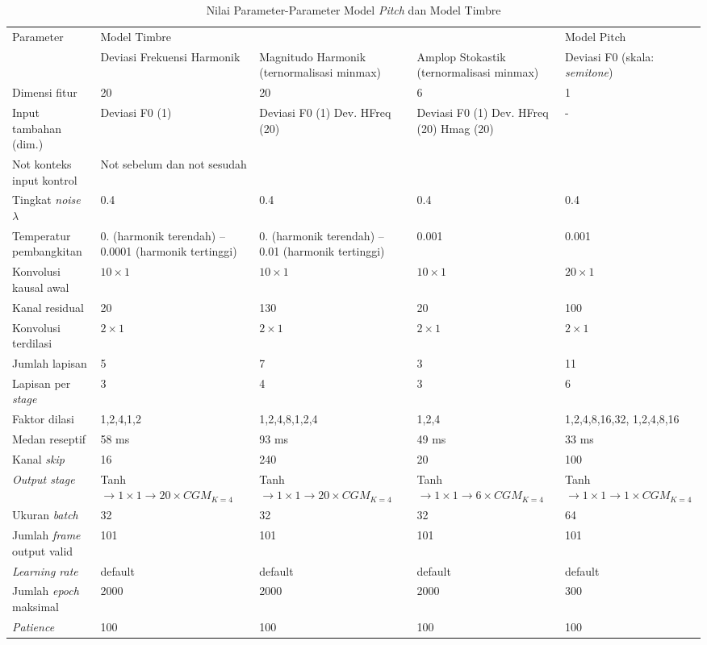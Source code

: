 \begin{table}[htbp]
	\newlength\colwidth
	\setlength{}
	\centering
	\caption{Nilai Parameter-Parameter Model \textit{Pitch} dan Model Timbre}\label{tab-timbre-pitch-model-parameters}
	\begin{tabular}{|p{\colwidth}|p{\colwidth}|p{\colwidth}|p{\colwidth}|p{\colwidth}|}
	\hline
	\multirow{2}{*}{Parameter}&\multicolumn{3}{|p{\dimexpr 3\colwidth}|}{Model Timbre}&{Model Pitch}\\\cline{2-5}
	&Deviasi Frekuensi Harmonik&Magnitudo Harmonik (ternormalisasi minmax)&Amplop Stokastik (ternormalisasi minmax)&Deviasi F0 (skala: \textit{semitone})\\\hline
	Dimensi fitur&20&20&6&1\\\hline
	Input tambahan (dim.)& Deviasi F0 (1) & Deviasi F0 (1) \newline Dev. HFreq (20) & Deviasi F0 (1) \newline Dev. HFreq (20) \newline Hmag (20) & - \\
	\hline
	Not konteks input kontrol & \multicolumn{4}{|p{\dimexpr 4\colwidth}|}{
	Not sebelum dan not sesudah
	}\\\hline
	Tingkat \textit{noise} $\lambda$ & 0.4&0.4&0.4&0.4\\\hline
	Temperatur pembangkitan & 0. (harmonik terendah) – 0.0001 (harmonik tertinggi) & 0. (harmonik terendah) – 0.01 (harmonik tertinggi) & 0.001 & 0.001 \\\hline
	Konvolusi kausal awal & $10 \times 1$ & $10 \times 1$ & $10 \times 1 $ & $20 \times 1 $\\\hline
	Kanal residual & 20 & 130 & 20 & 100 \\\hline
	Konvolusi terdilasi & $2\times 1$ & $2\times 1$ & $2\times 1$ & $2\times 1$ \\\hline
	Jumlah lapisan & 5 & 7 & 3 & 11\\\hline
	Lapisan per \textit{stage} & 3 & 4 & 3 & 6\\\hline
	Faktor dilasi & 1,2,4,1,2 & 1,2,4,8,1,2,4 & 1,2,4 & 1,2,4,8,16,32, 1,2,4,8,16\\\hline
	Medan reseptif&58 ms & 93 ms & 49 ms & 33 ms\\\hline
	Kanal \textit{skip}&16&240&20&100\\\hline
	\textit{Output stage}&Tanh$\rightarrow 1\times 1 \rightarrow 20\times CGM_{K=4}$&Tanh$\rightarrow 1\times 1 \rightarrow 20\times CGM_{K=4}$&Tanh$\rightarrow 1\times 1 \rightarrow 6\times CGM_{K=4}$&Tanh$\rightarrow 1\times 1 \rightarrow 1\times CGM_{K=4}$\\\hline
	Ukuran \textit{batch} &32&32&32& 64\\\hline
	Jumlah \textit{frame} output valid & 101 & 101 & 101 & 101 \\\hline
	\textit{Learning rate} & default & default & default & default\\\hline
	Jumlah \textit{epoch} maksimal & 2000 & 2000 & 2000 & 300 \\\hline
	\textit{Patience} & 100 & 100 & 100 & 100 \\\hline
	\end{tabular}
\end{table}
